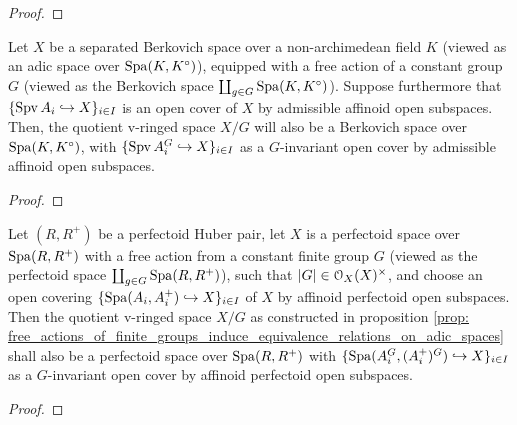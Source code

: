                 \begin{proof}
                    
                \end{proof}
                
            \begin{theorem} \label{coro: quotients_of_berkovich_spaces_by_free_actions_of_finite_groups}
                Let $X$ be a separated Berkovich space over a non-archimedean field $K$ (viewed as an adic space over $\operatorname{Spa}(K, K^{\circ})$), equipped with a free action of a constant group $G$ (viewed as the Berkovich space $\coprod_{g \in G} \operatorname{Spa}(K, K^{\circ})$). Suppose furthermore that $\{\operatorname{Spv} A_i \hookrightarrow X\}_{i \in I}$ is an open cover of $X$ by admissible affinoid open subspaces. Then, the quotient v-ringed space $X/G$ will also be a Berkovich space over $\operatorname{Spa}(K, K^{\circ})$, with $\{\operatorname{Spv} A_i^G \hookrightarrow X\}_{i \in I}$ as a $G$-invariant open cover by admissible affinoid open subspaces.
            \end{theorem}
                \begin{proof}
                    
                \end{proof}
                
            \begin{theorem} \label{coro: quotients_of_perfectoid_spaces_by_free_actions_of_finite_groups}
                Let $(R, R^+)$ be a perfectoid Huber pair, let $X$ is a perfectoid space over $\operatorname{Spa}(R, R^+)$ with a free action from a constant finite group $G$ (viewed as the perfectoid space $\coprod_{g \in G} \operatorname{Spa}(R, R^+)$), such that $|G| \in \calO_X(X)^{\x}$, and choose an open covering $\{\operatorname{Spa}(A_i, A_i^+) \hookrightarrow X\}_{i \in I}$ of $X$ by affinoid perfectoid open subspaces. Then the quotient v-ringed space $X/G$ as constructed in proposition \ref{prop: free_actions_of_finite_groups_induce_equivalence_relations_on_adic_spaces} shall also be a perfectoid space over $\operatorname{Spa}(R, R^+)$ with $\{\operatorname{Spa}(A_i^G, (A_i^+)^G) \hookrightarrow X\}_{i \in I}$ as a $G$-invariant open cover by affinoid perfectoid open subspaces.
            \end{theorem}
                \begin{proof}
                    
                \end{proof}
    

